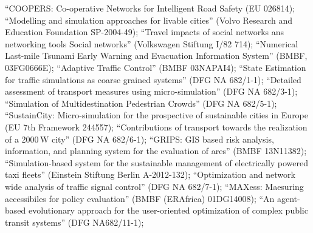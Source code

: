 ``COOPERS: Co-operative Networks for Intelligent Road Safety (EU 026814);
``Modelling and simulation approaches for livable cities'' (Volvo Research and Education Foundation SP-2004-49);
``Travel impacts of social networks ans networking  tools Social networks'' (Volkswagen Stiftung I/82 714);
``Numerical Last-mile Tsunami Early Warning and Evacuation Information System'' (BMBF, 03FG0666E);
``Adaptive Traffic Control'' (BMBF 03NAPAI4);
``State Estimation for traffic simulations as coarse grained systems'' (DFG NA 682/1-1);
``Detailed assessment of transport measures using micro-simulation'' (DFG NA 682/3-1);
``Simulation of Multidestination Pedestrian Crowds'' (DFG NA 682/5-1);
``SustainCity: Micro-simulation for the prospective of sustainable cities in Europe (EU 7th Framework 244557);
``Contributions of transport towards the realization of a 2000\,W city'' (DFG NA 682/6-1);
``GRIPS: GIS based risk analysis, information, and planning system for the evaluation of ares'' (BMBF 13N11382);
``Simulation-based system for the sustainable management of electrically powered taxi fleets'' (Einstein Stiftung Berlin A-2012-132);
``Optimization and network wide analysis of traffic signal control'' (DFG NA 682/7-1);
``MAXess: Maesuring accessibiles for policy evaluation'' (BMBF (ERAfrica) 01DG14008); %
``An agent-based evolutionary approach for the user-oriented optimization of complex public transit systems'' (DFG NA682/11-1);

